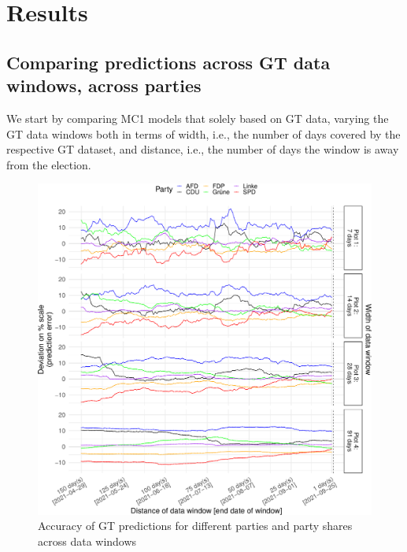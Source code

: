 \documentclass[
  letterpaper,
  DIV=11,
  numbers=noendperiod]{scrartcl}
\begin{document}
\hypertarget{sec-results}{%
\section{Results}\label{sec-results}}

\hypertarget{comparing-predictions-across-gt-data-windows-across-parties}{%
\subsection{Comparing predictions across GT data windows, across
parties}\label{comparing-predictions-across-gt-data-windows-across-parties}}

We start by comparing MC1 models that solely based on GT data, varying
the GT data windows both in terms of width, i.e., the number of days
covered by the respective GT dataset, and distance, i.e., the number of
days the window is away from the election.

\begin{figure}[H]

\caption{\label{fig-4}Accuracy of GT predictions for different parties
and party shares across data windows}

{\centering \includegraphics{figures/fig-4-1.pdf}

}

\end{figure}
\end{document}
